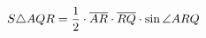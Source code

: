 \documentclass[preview]{standalone}
\begin{document}
\begin{align*}
S \triangle AQR = {1 \over 2} \cdot \overline{AR} \cdot \overline{RQ} \cdot \sin{\angle ARQ}
\end{align*}
\end{document}
